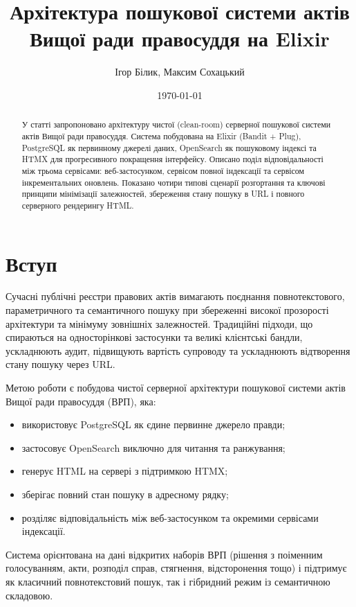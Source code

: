 \documentclass[12pt,a4paper]{article}
\title{Архітектура пошукової системи актів\\
Вищої ради правосуддя на Elixir}
\author{Ігор Білик, Максим Сохацький}
\date{\today}
\begin{document}
\maketitle

\begin{abstract}
У статті запропоновано архітектуру чистої (clean-room) серверної пошукової системи актів Вищої ради правосуддя. Система побудована на Elixir (Bandit + Plug), PostgreSQL як первинному джерелі даних, OpenSearch як пошуковому індексі та HTMX для прогресивного покращення інтерфейсу. Описано поділ відповідальності між трьома сервісами: веб-застосунком, сервісом повної індексації та сервісом інкрементальних оновлень. Показано чотири типові сценарії розгортання та ключові принципи мінімізації залежностей, збереження стану пошуку в URL і повного серверного рендерингу HTML.
\end{abstract}

\section{Вступ}

Сучасні публічні реєстри правових актів вимагають поєднання повнотекстового, параметричного та семантичного пошуку при збереженні високої прозорості архітектури та мінімуму зовнішніх залежностей. Традиційні підходи, що спираються на односторінкові застосунки та великі клієнтські бандли, ускладнюють аудит, підвищують вартість супроводу та ускладнюють відтворення стану пошуку через URL.

Метою роботи є побудова чистої серверної архітектури пошукової системи актів Вищої ради правосуддя (ВРП), яка:
\begin{itemize}
  \item використовує PostgreSQL як єдине первинне джерело правди;
  \item застосовує OpenSearch виключно для читання та ранжування;
  \item генерує HTML на сервері з підтримкою HTMX;
  \item зберігає повний стан пошуку в адресному рядку;
  \item розділяє відповідальність між веб-застосунком та окремими сервісами індексації.
\end{itemize}

Система орієнтована на дані відкритих наборів ВРП (рішення з поіменним голосуванням, акти, розподіл справ, стягнення, відсторонення тощо) і підтримує як класичний повнотекстовий пошук, так і гібридний режим із семантичною складовою.
\end{document}
